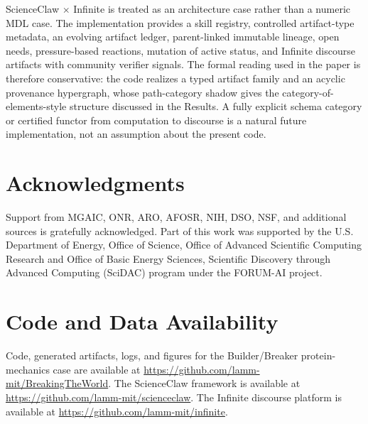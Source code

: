\documentclass[11pt]{article}
\theoremstyle{definition}
\begin{document}
ScienceClaw $\times$ Infinite is treated as an architecture case rather than a numeric MDL case. The implementation provides a skill registry, controlled artifact-type metadata, an evolving artifact ledger, parent-linked immutable lineage, open needs, pressure-based reactions, mutation of active status, and Infinite discourse artifacts with community verifier signals. The formal reading used in the paper is therefore conservative: the code realizes a typed artifact family and an acyclic provenance hypergraph, whose path-category shadow gives the category-of-elements-style structure discussed in the Results. A fully explicit schema category or certified functor from computation to discourse is a natural future implementation, not an assumption about the present code.

\section*{Acknowledgments}

Support from MGAIC, ONR, ARO, AFOSR, NIH, DSO, NSF, and additional sources is gratefully acknowledged. Part of this work was supported by the U.S. Department of Energy, Office of Science, Office of Advanced Scientific Computing Research and Office of Basic Energy Sciences, Scientific Discovery through Advanced Computing (SciDAC) program under the FORUM-AI project.

\section*{Code and Data Availability}

Code, generated artifacts, logs, and figures for the Builder/Breaker protein-mechanics case are available at \url{https://github.com/lamm-mit/BreakingTheWorld}. The ScienceClaw framework is available at \url{https://github.com/lamm-mit/scienceclaw}. The Infinite discourse platform is available at \url{https://github.com/lamm-mit/infinite}. 




\end{document}
